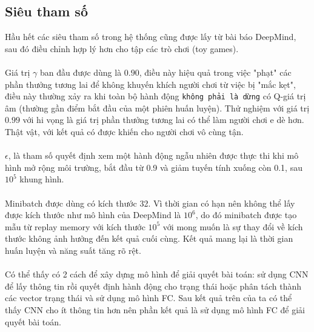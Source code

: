 \documentclass[12pt,a4paper]{article}
\begin{document}
\subsection{Siêu tham số}
Hầu hết các siêu tham số trong hệ thống cũng được lấy từ bài báo DeepMind, sau đó điều chỉnh hợp lý hơn cho tập các trò chơi (toy games). \\
\\
Giá trị $\gamma$ ban đầu được dùng là $0.90$, điều này hiệu quả trong việc "phạt" các phần thưởng tương lai để không khuyến khích người chơi từ việc bị "mắc kẹt", điều này thường xảy ra khi toàn bộ hành động \texttt{không phải là dừng} có Q-giá trị âm (thường gần điểm bắt đầu của một phiên huấn luyện). Thử nghiệm với giá trị $0.99$ với hi vọng là giá trị phần thưởng tương lai có thể làm người chơi e dè hơn. Thật vật, với kết quả có được khiến cho người chơi  vô cùng tận.\\
\\
$\epsilon$, là tham số quyết định xem một hành động ngẫu nhiên được thực thi khi mô hình mở rộng môi trường, bắt đầu từ 0.9 và giảm tuyến tính xuống còn 0.1, sau $10^5$ khung hình.\\
\\
Minibatch được dùng có kích thước 32. Vì thời gian có hạn nên không thể lấy được kích thước như mô hình của DeepMind là $10^6$, do đó minibatch được tạo mẫu từ replay memory với kích thước $10^5$ với mong muốn là sự thay đổi về kích thước không ảnh hưởng đến kết quả cuối cùng. Kết quả mang lại là thời gian huấn luyện và năng suất tăng rõ rệt.\\
\\
Có thể thấy có 2 cách để xây dựng mô hình để giải quyết bài toán: sử dụng CNN để lấy thông tin rồi quyết định hành động cho trạng thái hoặc phân tách thành các vector trạng thái  và sử dụng mô hình FC. Sau kết quả trên của ta có thể thấy CNN cho ít thông tin hơn nên phần kết quả là sử dụng mô hình FC để giải quyết bài toán.
\end{document}
